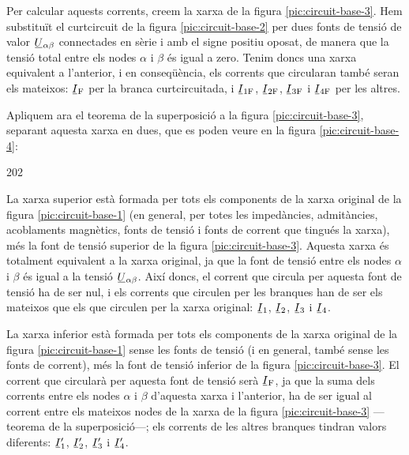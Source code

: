 \begin{center}
	
	\label{pic:circuit-base-2}
\end{center}


Per  calcular aquests corrents, creem  la xarxa de la figura  \vref{pic:circuit-base-3}. Hem substituït el curtcircuit de la  figura \vref{pic:circuit-base-2} per dues fonts de tensió de valor $\cmplx{U}_{\alpha\beta}$ connectades en sèrie i amb el signe positiu oposat, de manera que la tensió total entre els nodes $\alpha$ i $\beta$ és igual a zero. Tenim doncs una xarxa equivalent a l'anterior, i en conseqüència, els corrents que circularan també seran els mateixos: $\cmplx{I}\ped{F}$ per la branca curtcircuitada, i  $\cmplx{I}\ped{1F}$, $\cmplx{I}\ped{2F}$, $\cmplx{I}\ped{3F}$ i $\cmplx{I}\ped{4F}$ per les altres.

\begin{center}
	
	\label{pic:circuit-base-3}
\end{center}

Apliquem ara el teorema de la superposició a la figura \vref{pic:circuit-base-3}, separant aquesta xarxa en dues, que es poden veure en la figura \vref{pic:circuit-base-4}:
\begin{dingautolist}{202}
	\item La xarxa superior està formada per tots els  components de la xarxa original de la figura \vref{pic:circuit-base-1} (en general, per totes les impedàncies, admitàncies, acoblaments magnètics, fonts de tensió i fonts de corrent que tingués la xarxa), més la font de tensió superior de la figura \vref{pic:circuit-base-3}. Aquesta xarxa és totalment equivalent a la xarxa original, ja que la font de tensió entre els nodes $\alpha$ i $\beta$ és igual  a  la tensió $\cmplx{U}_{\alpha\beta}$. Així doncs, el corrent que circula per aquesta font de tensió ha de ser nul, i els corrents que circulen per les branques han de ser els mateixos que els que circulen per la xarxa original: $\cmplx{I}_1$, $\cmplx{I}_2$, $\cmplx{I}_3$ i $\cmplx{I}_4$.
	
	\item  La xarxa inferior està formada per tots els  components de la xarxa original de la figura \vref{pic:circuit-base-1} sense les fonts de tensió (i en general, també sense les fonts de corrent),  més la font de tensió inferior de la figura \vref{pic:circuit-base-3}. El corrent que circularà per aquesta font de tensió serà $\cmplx{I}\ped{F}$, ja que la suma dels corrents entre els nodes $\alpha$ i $\beta$ d'aquesta xarxa i l'anterior, ha de ser igual al corrent entre els mateixos nodes  de la xarxa de la  figura \vref{pic:circuit-base-3} ---teorema de la superposició---; els corrents de les altres branques tindran valors diferents: $\cmplx{I}_1'$, $\cmplx{I}_2'$, $\cmplx{I}_3'$ i $\cmplx{I}_4'$.
\end{dingautolist}

